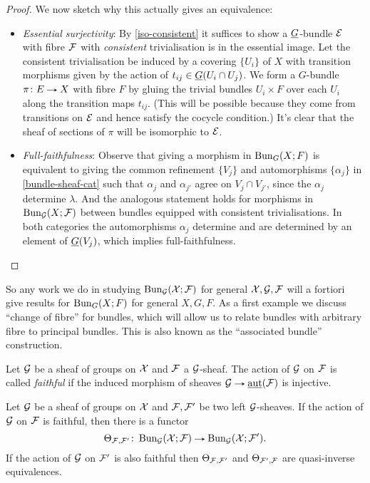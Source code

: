 \begin{proof}
  We now sketch why this actually gives an equivalence:
  \begin{itemize}
  \item \emph{Essential surjectivity}: By \cref{iso-consistent} it
    suffices to show a $\underline{G}$-bundle $\mathcal{E}$ with fibre $\mathcal{F}$ with
    \emph{consistent} trivialisation is in the essential image. Let
    the consistent trivialisation be induced by a covering $\{U_i\}$
    of $X$ with transition morphisms given by the action of $t_{ij}
    \in \underline{G}(U_i \cap U_j)$. We form a $G$-bundle $\pi \c E \to X$
    with fibre $F$ by gluing the trivial bundles $U_i \times F$ over
    each $U_i$ along the transition maps $t_{ij}$. (This will be
    possible because they come from transitions on $\mathcal{E}$ and hence
    satisfy the cocycle condition.)  It's clear that the sheaf of
    sections of $\pi$ will be isomorphic to $\mathcal{E}$.
  \item \emph{Full-faithfulness}: Observe that giving a morphism in
    $\operatorname{Bun}_G(X;F)$ is equivalent to giving the common refinement
    $\{V_j\}$ and automorphisms $\{\alpha_j\}$ in
    \cref{bundle-sheaf-cat} such that $\alpha_j$ and $\alpha_{j'}$
    agree on $V_j \cap V_{j'}$, since the $\alpha_j$ determine
    $\lambda$. And the analogous statement holds for morphisms in
    $\operatorname{Bun}_{\mathcal{G}}(X;\mathcal{F})$ between bundles equipped with consistent
    trivialisations. In both categories the automorphisms $\alpha_j$
    determine and are determined by an element of $\underline{G}(V_j)$, which
    implies full-faithfulness. \qedhere
  \end{itemize}
\end{proof}

So any work we do in studying $\operatorname{Bun}_{\mathcal{G}}(\mathcal{X};\mathcal{F})$ for general $\mathcal{X},\mathcal{G},\mathcal{F}$
will a fortiori give results for $\operatorname{Bun}_G(X;F)$ for general $X,G,F$. As
a first example we discuss ``change of fibre'' for bundles, which will
allow us to relate bundles with arbitrary fibre to principal
bundles. This is also known as the ``associated bundle'' construction.

\begin{definition}
  Let $\mathcal{G}$ be a sheaf of groups on $\mathcal{X}$ and $\mathcal{F}$ a $\mathcal{G}$-sheaf. The
  action of $\mathcal{G}$ on $\mathcal{F}$ is called \emph{faithful} if the induced
  morphism of sheaves $\G \to \saut(\F)$ is injective.
\end{definition}

\begin{proposition}
  Let $\mathcal{G}$ be a sheaf of groups on $\mathcal{X}$ and $\mathcal{F},\mathcal{F}'$ be two left
  $\mathcal{G}$-sheaves. If the action of $\mathcal{G}$ on $\mathcal{F}$ is faithful, then there
  is a functor
  \[
  \Theta_{\F,\F'} \c \Bun_\G(\X;\F) \to \Bun_\G(\X;\F').
  \]
  If the action of $\mathcal{G}$ on $\mathcal{F}'$ is also faithful then
  $\Theta_{\mathcal{F},\mathcal{F}'}$ and $\Theta_{\mathcal{F}',\mathcal{F}}$ are quasi-inverse
  equivalences.
\end{proposition}

